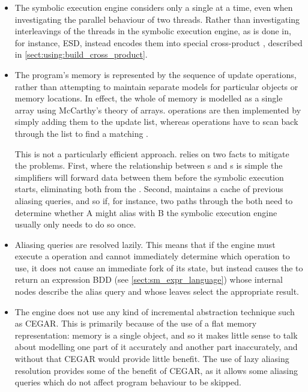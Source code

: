 \begin{itemize}
\item The symbolic execution engine considers only a single
  {\StateMachine} at a time, even when investigating the parallel
  behaviour of two threads.  Rather than investigating interleavings
  of the threads in the symbolic execution engine, as is done in, for
  instance, ESD\cite{Zamfir2010}, {\technique} instead encodes them
  into special cross-product {\StateMachines}, described in
  \autoref{sect:using:build_cross_product}.

\item The program's memory is represented by the sequence of update
  operations, rather than attempting to maintain separate models for
  particular objects or memory locations.  In effect, the whole of
  memory is modelled as a single array using McCarthy's theory of
  arrays\needCite{}.   operations are then implemented by
  simply adding them to the update list, whereas 
  operations have to scan back through the list to find a matching
  .

  This is not a particularly efficient approach.  {\Implementation}
  relies on two facts to mitigate the problems.  First, where the
  relationship between s and s is simple the
  {\StateMachine} simplifiers will forward data between them before
  the symbolic execution starts, eliminating both from the
  {\StateMachine}.  Second, {\implementation} maintains a cache of
  previous aliasing queries, and so if, for instance, two paths
  through the {\StateMachine} both need to determine whether
   A might alias with  B the symbolic
  execution engine usually only needs to do so once.

\item Aliasing queries are resolved lazily.  This means that if the
  engine must execute a  operation and cannot immediately
  determine which  operation to use, it does not cause an
  immediate fork of its state, but instead causes the  to
  return an expression BDD (see \autoref{sect:sm_expr_language}) whose
  internal nodes describe the alias query and whose leaves select the
  appropriate result.

\item The engine does not use any kind of incremental abstraction
  technique such as CEGAR\cite{Clarke2000}.  This is primarily because
  of the use of a flat memory representation: memory is a single
  object, and so it makes little sense to talk about modelling one
  part of it accurately and another part inaccurately, and without
  that CEGAR would provide little benefit.  The use of lazy aliasing
  resolution provides some of the benefit of CEGAR, as it allows some
  aliasing queries which do not affect program behaviour to be
  skipped.


\end{itemize}
